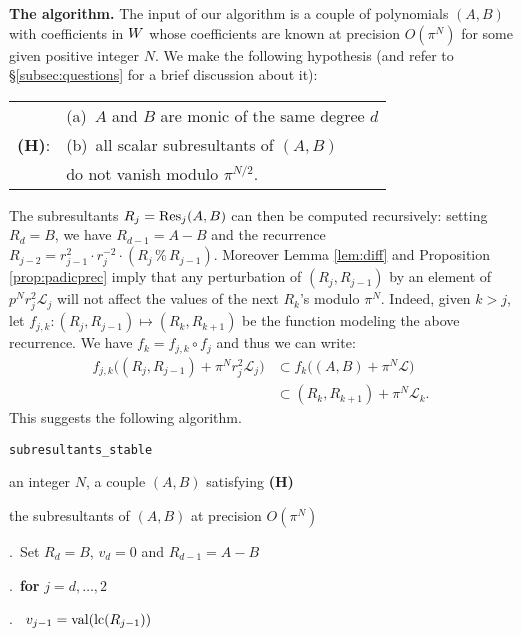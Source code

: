 \documentclass{sig-alternate}
\DeclareMathOperator{\val}{val}
\begin{document}
\noindent
{\bf The algorithm.}
The input of our algorithm is a couple of polynomials $(A,B)$ with 
coefficients in $W$ whose coefficients are known at precision 
$O(\pi^N)$ for some given positive integer $N$. We make the following 
hypothesis (and refer to \S \ref{subsec:questions} for a brief 
discussion about it):

\medskip

\begin{tabular}{rl}
& (a)~$A$ and $B$ are monic of the same degree $d$ \\
{\bf (H)}: & (b)~all scalar subresultants of $(A,B)$ \\
& \phantom{(b)~}do not vanish modulo $\pi^{N/2}$.
\end{tabular}

\medskip

\noindent
The subresultants $R_j = \text{\rm Res}_j(A,B)$ can then be computed recursively:
setting $R_d = B$, we have $R_{d-1} = A-B$ and the recurrence
$R_{j-2} = r_{j-1}^2 \cdot r_j^{-2} \cdot (R_j \,\%\, R_{j-1})$.
Moreover Lemma \ref{lem:diff} and Proposition \ref{prop:padicprec} imply
that any perturbation of $(R_j, R_{j-1})$ by an element of $p^N r_j^2 
\mathcal L_j$ will not affect the values of the next $R_k$'s modulo 
$\pi^N$. Indeed, given $k > j$, let $f_{j,k} : (R_j, R_{j-1}) \mapsto 
(R_k, R_{k+1})$ be the function modeling the above recurrence. We have
$f_k = f_{j,k} \circ f_j$ and thus we can write:
\begin{align*}
f_{j,k}\big((R_j, R_{j-1}) + \pi^N r_j^2 \mathcal L_j\big) 
& \subset f_k\big((A,B) + \pi^N \mathcal L\big) \\
& \subset (R_k, R_{k+1}) + \pi^N \mathcal L_k.
\end{align*}
This suggests the following algorithm.

\noindent\hrulefill

 {\tt subresultants\_stable}

 an integer $N$, a couple $(A,B)$ satisfying {\bf (H)}

 the subresultants of $(A,B)$ at precision $O(\pi^N)$

\smallskip{}.\ Set $R_d = B$, $v_d = 0$ and $R_{d-1} = A-B$

\smallskip{}.\ {\bf for} $j=d,\dots,2$

\smallskip{}.\ \hspace{0.3cm}{\bf compute} $v_{j-1} = \val(\lc(R_{j-1}))$
\end{document}
